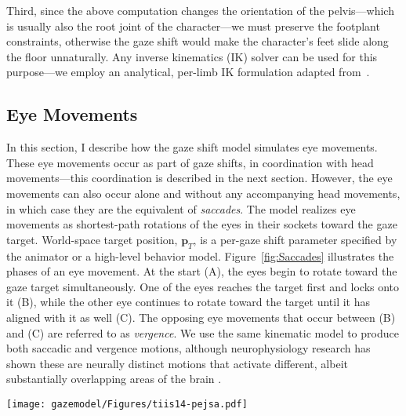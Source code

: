 Third, since the above computation changes the orientation of the pelvis---which is usually also the root joint of the character---we must preserve the footplant constraints, otherwise the gaze shift would make the character's feet slide along the floor unnaturally. Any inverse kinematics (IK) solver can be used for this purpose---we employ an analytical, per-limb IK formulation adapted from~\cite{shin2001puppetry}.

\subsection{Eye Movements}
\label{sec:GazeShiftEyes}

In this section, I describe how the gaze shift model simulates eye movements. These eye movements occur as part of gaze shifts, in coordination with head movements---this coordination is described in the next section. However, the eye movements can also occur alone and without any accompanying head movements, in which case they are the equivalent of \emph{saccades}.
The model realizes eye movements as shortest-path rotations of the eyes in their sockets toward the gaze target. World-space target position, $\mathbf{p}_T$, is a per-gaze shift parameter specified by the animator or a high-level behavior model. Figure~\ref{fig:Saccades} illustrates the phases of an eye movement. At the start (A), the eyes begin to rotate toward the gaze target simultaneously. One of the eyes reaches the target first and locks onto it (B), while the other eye continues to rotate toward the target until it has aligned with it as well (C). The opposing eye movements that occur between (B) and (C) are referred to as \emph{vergence}. We use the same kinematic model to produce both saccadic and vergence motions, although neurophysiology research has shown these are neurally distinct motions that activate different, albeit substantially overlapping areas of the brain \cite{alkan2011differentiation}.

\begin{figure*}[b]
\centering
\texttt{[image: gazemodel/Figures/tiis14-pejsa.pdf]}
\caption{Phases of an eye saccade. Dashed arrows indicate eye gaze directions, while the curved arrow indicates the direction of the rotational movement. Saccade proceeds as follows: (A) Eyes begin to rotate toward the target. (B) First eye has reached the target. (C) Both eyes have reached the target.}
\label{fig:Saccades}
\end{figure*}

